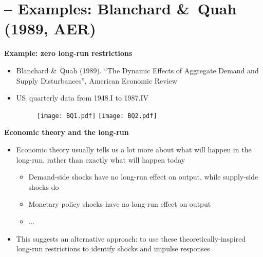 \documentclass[10pt,handout]{beamer}
\begin{document}
\vspace{0.1cm}

\section{ -- Examples: Blanchard \&\ Quah (1989, AER)}

\begin{frame}
{\textbf{Example: zero long-run restrictions}}

\begin{itemize}
\item Blanchard \&\ Quah (1989). \textquotedblleft The Dynamic Effects of
Aggregate Demand and Supply Disturbances\textquotedblright , American
Economic Review\smallskip

\item US\ quarterly data from 1948.I to 1987.IV 
\begin{figure}[h]
\centering\texttt{[image: BQ1.pdf]} %
\texttt{[image: BQ2.pdf]}
\end{figure}
\end{itemize}
\end{frame}

\vspace{.1cm}

\begin{frame}
{\textbf{Economic theory and the long-run}}

\begin{itemize}
\item Economic theory usually tells us a lot more about what will happen in
the long-run, rather than exactly what will happen today\smallskip \pause

\begin{itemize}
\item Demand-side shocks have no long-run effect on output, while
supply-side shocks do\smallskip \pause

\item Monetary policy shocks have no long-run effect on output\smallskip 
\pause

\item ...\medskip
\end{itemize}

\item This suggests an alternative approach: to use these
theoretically-inspired long-run restrictions to identify shocks and impulse
responses
\end{itemize}
\end{frame}
\end{document}
